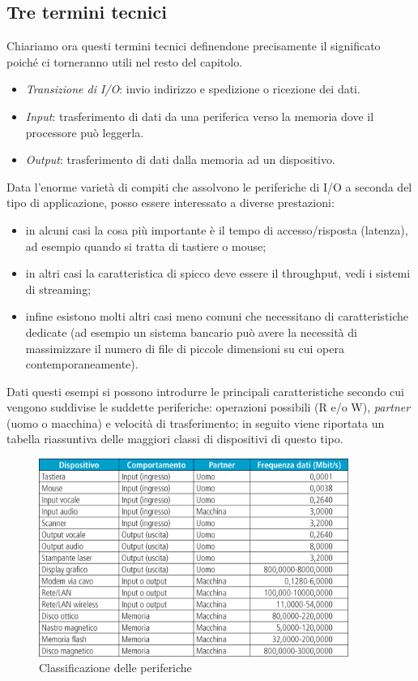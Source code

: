 \documentclass[class=book, crop=false, oneside]{standalone}
\begin{document}
\subsection*{Tre termini tecnici}
Chiariamo ora questi termini tecnici definendone precisamente il significato poiché ci torneranno utili nel resto del capitolo.
\begin{itemize}
	\item \emph{Transizione di I/O}: invio indirizzo e spedizione o ricezione dei dati.
	\item \emph{Input}: trasferimento di dati da una periferica verso la memoria dove il processore può leggerla.
	\item \emph{Output}: trasferimento di dati dalla memoria ad un dispositivo.
\end{itemize}
Data l'enorme varietà di compiti che assolvono le periferiche di I/O a  seconda del tipo di applicazione, posso essere interessato a diverse prestazioni:
\begin{itemize}
	\item in alcuni casi la cosa più importante è il tempo di accesso/risposta (latenza), ad esempio quando si tratta di tastiere o mouse;
	\item in altri casi la caratteristica di spicco deve essere il throughput, vedi i sistemi di streaming;
	\item infine esistono molti altri casi meno comuni che necessitano di caratteristiche dedicate (ad esempio un sistema bancario può avere la necessità di massimizzare il numero di file di piccole dimensioni su cui opera contemporaneamente).
\end{itemize}
Dati questi esempi si possono introdurre le principali caratteristiche secondo cui vengono suddivise le suddette periferiche: operazioni possibili (R e/o W), \emph{partner} (uomo o macchina) e velocità di trasferimento; in seguito viene riportata un tabella riassuntiva delle maggiori classi di dispositivi di questo tipo.

\begin{figure}[H]
	\centering
	\includegraphics[width=0.9\textwidth,keepaspectratio]{classificazione-periferiche}
	\caption{Classificazione delle periferiche}
\end{figure}
\end{document}
